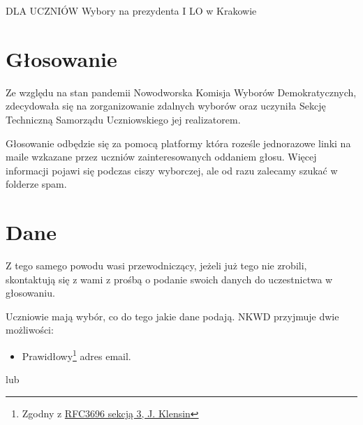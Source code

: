 \pagestyle{fancy}


\unappendix

\begin{center}
  \LARGE{ \textsc{DLA UCZNIÓW}}
  \vspace{0.3cm}
  \hline
  \vspace{1.2cm}
  Wybory na prezydenta I LO w Krakowie
  \vspace{0.8cm}
\end{center}

\section{Głosowanie}
\normalsize
\normalshape

\hspace{0.5cm} Ze względu na stan pandemii Nowodworska Komisja Wyborów Demokratycznych, zdecydowała się na zorganizowanie zdalnych wyborów oraz uczyniła Sekcję Techniczną Samorządu Uczniowskiego jej realizatorem. \par
Głosowanie odbędzie się za pomocą platformy która roześle jednorazowe linki na maile wzkazane przez uczniów zainteresowanych oddaniem głosu. Więcej informacji pojawi się podczas ciszy wyborczej, ale od razu zalecamy szukać w folderze spam.

\section{Dane}

\hspace{0.5cm} Z tego samego powodu wasi przewodniczący, jeżeli już tego nie zrobili, skontaktują się z wami z prośbą o podanie swoich danych do uczestnictwa w głosowaniu.\par
\vspace{0.3cm}
Uczniowie mają wybór, co do tego jakie dane podają. NKWD przyjmuje dwie możliwości:

\begin{itemize}
  \item Prawidłowy\footnote{Zgodny z \href{https://tools.ietf.org/html/rfc3696}{RFC3696 sekcją 3, J. Klensin}} adres email.
\end{itemize}

\vspace{-0.3cm}
\hspace{1cm} lub
\vspace{-0.3cm}

